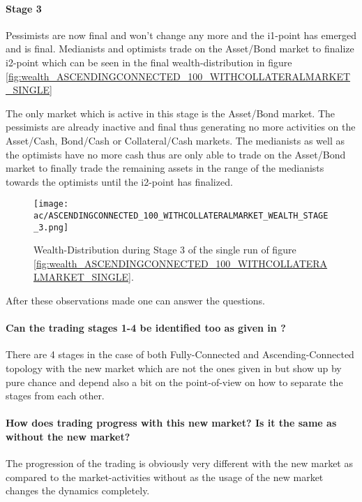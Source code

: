 \documentclass[Bachelorarbeit.tex]{subfiles}
\begin{document}
\paragraph{Stage 3}
Pessimists are now final and won't change any more and the i1-point has emerged and is final. Medianists and optimists trade on the Asset/Bond market to finalize i2-point which can be seen in the final wealth-distribution in figure \ref{fig:wealth_ASCENDINGCONNECTED_100_WITHCOLLATERALMARKET_SINGLE}

\medskip
The only market which is active in this stage is the Asset/Bond market. The pessimists are already inactive and final thus generating no more activities on the Asset/Cash, Bond/Cash or Collateral/Cash markets. The medianists as well as the optimists have no more cash thus are only able to trade on the Asset/Bond market to finally trade the remaining assets in the range of the medianists towards the optimists until the i2-point has finalized.

\begin{figure}[H]
	\centering
  \texttt{[image: ac/ASCENDINGCONNECTED\_100\_WITHCOLLATERALMARKET\_WEALTH\_STAGE\_3.png]}
  	\caption{Wealth-Distribution during Stage 3 of the single run of figure \ref{fig:wealth_ASCENDINGCONNECTED_100_WITHCOLLATERALMARKET_SINGLE}.}
	\label{fig:wealth_ASCENDINGCONNECTED_100_WITHCOLLATERALMARKET_WEALTH_STAGE_3}
\end{figure}

After these observations made one can answer the questions.

\paragraph{Can the trading stages 1-4 be identified too as given in \cite{Breuer2015}?}
There are 4 stages in the case of both Fully-Connected and Ascending-Connected topology with the new market which are not the ones given in \cite{Breuer2015} but show up by pure chance and depend also a bit on the point-of-view on how to separate the stages from each other. 

\paragraph{How does trading progress with this new market? Is it the same as without the new market?}
The progression of the trading is obviously very different with the new market as compared to the market-activities without as the usage of the new market changes the dynamics completely.
\end{document}
